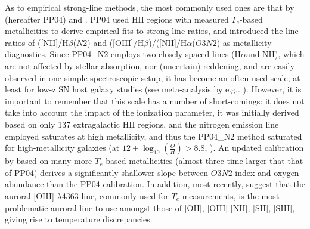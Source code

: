 \documentclass{emulateapj}
\newcommand{\oxab}{\ensuremath{12 + \log_{10}(\frac{O}{H})}}
\newcommand{\ha}{H$\alpha$}
\newcommand{\hb}{H$\beta$}
\begin{document}
As to empirical strong-line methods, the most commonly used ones are that by \citet{pettini04} (hereafter PP04) and \citet{pilyugin05}. PP04 used HII regions with measured $T_e$-based metallicities to derive empirical fits to strong-line ratios, and introduced the line ratios of ([NII]/\hb ($N2$) and ([OIII]$/$\hb)$/$([NII]$/$\ha ($O3N2$) as metallicity diagnostics. Since PP04\_N2 employs two closely spaced lines (\ha and NII), which are not affected by stellar absorption, nor (uncertain) reddening, and are easily observed in one simple spectroscopic setup, it has become an often-used scale, at least for low-z SN host galaxy studies (see meta-analysis by e.g,. \citealt{sanders12,modjaz12_proc,leloudas14}). However, it is important to remember that this scale has a number of short-comings: it does not take into account the impact of the ionization parameter, it was initially derived based on only 137 extragalactic HII regions, and the nitrogen emission line employed saturates at high metallicity, and thus the PP04\_N2 method saturated for high-metallicity galaxies (at $\oxab > 8.8$, \citealt{kewley08}). An updated calibration by \citet{marino13} based on many more $T_e$-based metallicities (almost three time larger that that of PP04) derives a significantly shallower slope between $O3N2$ index and oxygen abundance than the PP04 calibration. In addition, most recently, \citet{berg15} suggest that the auroral [OIII] $\lambda$4363 line, commonly used for $T_e$ measurements, is the most problematic auroral line to use amongst those of [OII], [OIII] [NII], [SII], [SIII], giving rise to temperature discrepancies.
\end{document}
